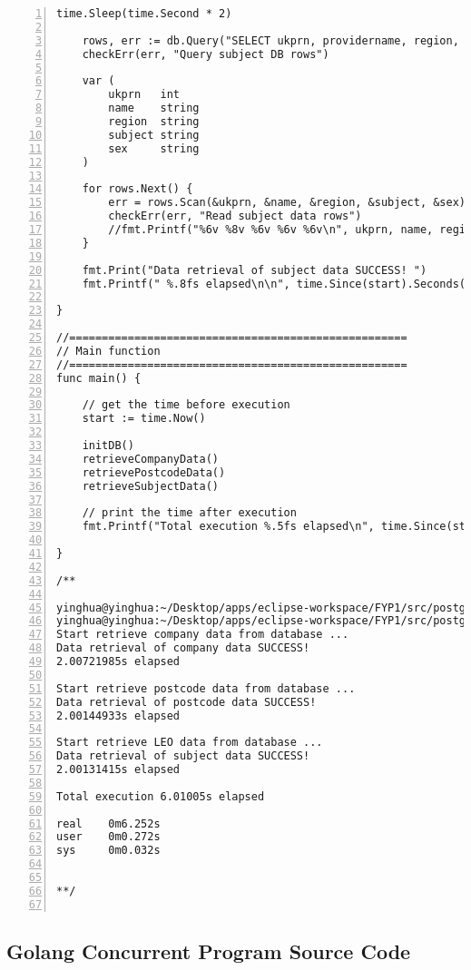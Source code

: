 \begin{lstlisting}[breaklines, frame=single, numbers=left, caption={Golang Sequential Program Source Code}, label=commandline-02]
	time.Sleep(time.Second * 2)
	
	rows, err := db.Query("SELECT ukprn, providername, region, subject, sex FROM go_subject LIMIT 50")
	checkErr(err, "Query subject DB rows")
	
	var (
		ukprn   int
		name    string
		region  string
		subject string
		sex     string
	)
	
	for rows.Next() {
		err = rows.Scan(&ukprn, &name, &region, &subject, &sex)
		checkErr(err, "Read subject data rows")
		//fmt.Printf("%6v %8v %6v %6v %6v\n", ukprn, name, region, subject, sex)
	}
	
	fmt.Print("Data retrieval of subject data SUCCESS! ")
	fmt.Printf(" %.8fs elapsed\n\n", time.Since(start).Seconds())

}

//====================================================
// Main function
//====================================================
func main() {

	// get the time before execution
	start := time.Now()
	
	initDB()
	retrieveCompanyData()
	retrievePostcodeData()
	retrieveSubjectData()
	
	// print the time after execution
	fmt.Printf("Total execution %.5fs elapsed\n", time.Since(start).Seconds())

}

/**

yinghua@yinghua:~/Desktop/apps/eclipse-workspace/FYP1/src/postgres-process$ go build sequential-psql.go
yinghua@yinghua:~/Desktop/apps/eclipse-workspace/FYP1/src/postgres-process$ time go run sequential-psql.go
Start retrieve company data from database ...
Data retrieval of company data SUCCESS!
2.00721985s elapsed

Start retrieve postcode data from database ...
Data retrieval of postcode data SUCCESS!
2.00144933s elapsed

Start retrieve LEO data from database ...
Data retrieval of subject data SUCCESS!
2.00131415s elapsed

Total execution 6.01005s elapsed

real	0m6.252s
user	0m0.272s
sys		0m0.032s


**/


\end{lstlisting}

\pagebreak

\subsection {Golang Concurrent Program Source Code}

